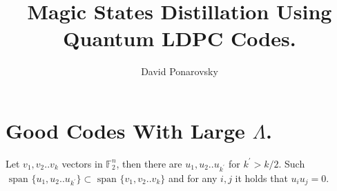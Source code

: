 \documentclass[manuscript,screen,review]{acmart}
\begin{document}

\title{Magic States Distillation Using Quantum LDPC Codes. } 
\author{David Ponarovsky}
\maketitle




%
%

\section{Good Codes With Large $\Lambda$.}
\newcommand*{\DETAILS}{}
\ifdefined\DETAILS


\fi

\begin{claim}
    \label{claim:find}
    Let $v_{1},v_{2}..v_{k}$ vectors in $\mathbb{F}_{2}^{n}$, then there are $u_{1},u_{2}..u_{k^{\prime}}$ for $k^{\prime} > k/2$. Such $\text{ span } \{   u_{1},u_{2}..u_{k^{\prime}} \} \subset \text{ span } \{ v_{1},v_{2}..v_{k} \}$ and for any $i,j$ it holds that $u_{i}u_{j} = 0$. 
  \end{claim}
\end{document}
